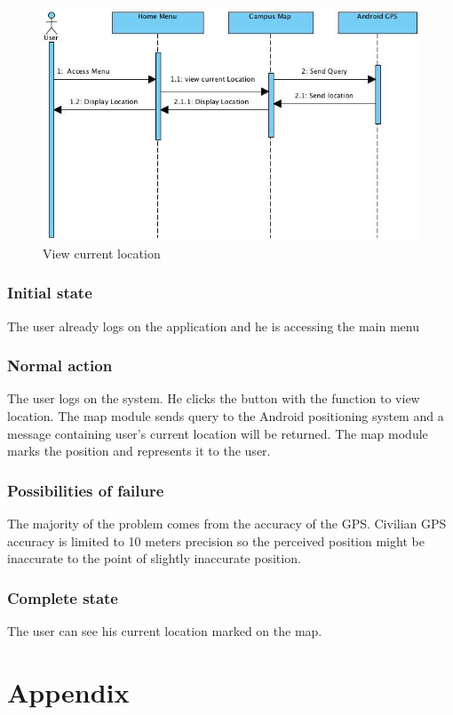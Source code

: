 \documentclass[10pt,a4paper,oneside]{report}
\begin{document}
\begin{figure}[H]
 \centering
 \includegraphics[keepaspectratio, scale=0.5]{seqfriend.png}
 \caption{View current location}
\end{figure}

\subsubsection*{Initial state}
The user already logs on the application and he is accessing the main menu
\subsubsection*{Normal action}
The user logs on the system. He clicks the button with the function to view location. The map module sends query to the Android positioning system and a message containing user’s current location will be returned. The map module marks the position and represents it to the user.
\subsubsection*{Possibilities of failure}
The majority of the problem comes from the accuracy of the GPS. Civilian GPS accuracy is limited to 10 meters precision so the perceived position might be inaccurate to the point of slightly inaccurate position.
\subsubsection*{Complete state}
The user can see his current location marked on the map.

\section*{Appendix}




\end{document}
